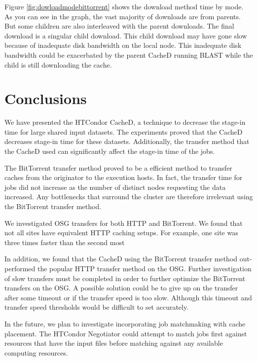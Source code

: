 Figure \ref{fig:dowloadmodebittorrent} shows the download method time by mode.  As you can see in the graph, the vast majority of downloads are from parents.  But some children are also interleaved with the parent downloads.  The final download is a singular child download.  This child download may have gone slow because of inadequate disk bandwidth on the local node.  This inadequate disk bandwidth could be exacerbated by the parent CacheD running BLAST while the child is still downloading the cache.



\section{Conclusions}
We have presented the HTCondor CacheD, a technique to decrease the stage-in time for large shared input datasets.  The experiments proved that the CacheD decreases stage-in time for these datasets.  Additionally, the transfer method that the CacheD used can significantly affect the stage-in time of the jobs.

The BitTorrent transfer method proved to be a efficient method to transfer caches from the originator to the execution hosts.  In fact, the transfer time for jobs did not increase as the number of distinct nodes requesting the data increased.  Any bottlenecks that surround the cluster are therefore irrelevant using the BitTorrent transfer method.

We investigated OSG transfers for both HTTP and BitTorrent.  We found that not all sites have equivalent HTTP caching setups.  For example, one site was three times faster than the second most 

In addition, we found that the CacheD using the BitTorrent transfer method out-performed the popular HTTP transfer method on the OSG.  Further investigation of slow transfers must be completed in order to further optimize the BitTorrent transfers on the OSG.  A possible solution could be to give up on the transfer after some timeout or if the transfer speed is too slow.  Although this timeout and transfer speed thresholds would be difficult to set accurately.


In the future, we plan to investigate incorporating job matchmaking with cache placement.  The HTCondor Negotiator could attempt to match jobs first against resources that have the input files before matching against any available computing resources.




